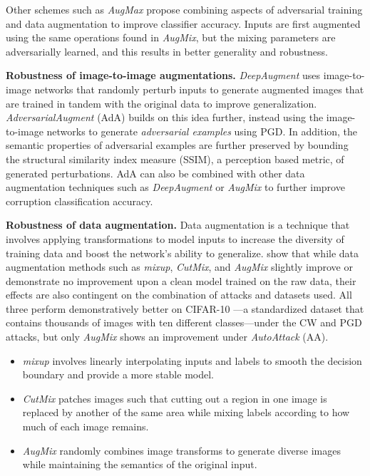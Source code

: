 \documentclass[a4paper]{article}
\begin{document}
\noindent
Other schemes such as \textit{AugMax} \cite{wang2021augmax} propose combining
aspects of adversarial training and data augmentation to improve classifier
accuracy. Inputs are first augmented using the same operations found in
\textit{AugMix}, but the mixing parameters are adversarially learned, and this
results in better generality and robustness.

\noindent\textbf{Robustness of image-to-image augmentations.}
\textit{DeepAugment} \cite{hendrycks2021faces} uses image-to-image networks that
randomly perturb inputs to generate augmented images that are trained in tandem
with the original data to improve generalization. \textit{AdversarialAugment}
(AdA) \cite{calian2022defendingimagecorruptionsadversarial} builds on this idea
further, instead using the image-to-image networks to generate
\textit{adversarial examples} using PGD. In addition, the semantic properties of
adversarial examples are further preserved by bounding the structural similarity
index measure (SSIM), a perception based metric, of generated perturbations.
AdA can also be combined with other data augmentation techniques such as
\textit{DeepAugment} or \textit{AugMix} to further improve corruption
classification accuracy.

\noindent\textbf{Robustness of data augmentation.}
Data augmentation is a technique that involves applying transformations to model
inputs to increase the diversity of training data and boost the network's
ability to generalize.
\textcite{wei2023empiricalriskminimizationlocal} show that while data
augmentation methods such as \textit{mixup}, \textit{CutMix}, and \textit
{AugMix} slightly improve or demonstrate no improvement upon a clean model
trained on the raw data, their effects are also contingent on the combination of
attacks and datasets used. All three perform demonstratively better on CIFAR-10
\cite{krizhevsky2009learning}—a standardized dataset that contains thousands of
images with ten different classes—under the CW and PGD attacks, but only
\textit{AugMix} shows an improvement under \textit{AutoAttack} (AA).

\begin{itemize}
    \item\textit{mixup} \cite{zhang2018mixup} involves linearly interpolating
    inputs and labels to smooth the decision boundary and provide a more stable
    model.
    \item\textit{CutMix} \cite{yun2019cutmix} patches images such that cutting
    out a region in one image is replaced by another of the same area while
    mixing labels according to how much of each image remains.
    \item\textit{AugMix} \cite{hendrycks2020augmix} randomly combines image
    transforms to generate diverse images while maintaining the semantics of
    the original input.
\end{itemize}
\end{document}
